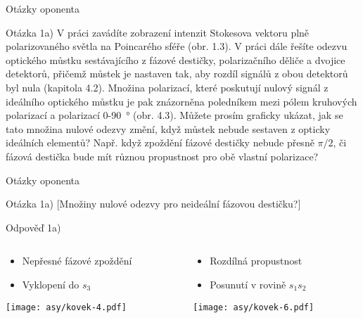 \begin{frame}{Otázky oponenta}
    \begin{block}{Otázka 1a)}
        V práci zavádíte zobrazení intenzit Stokesova vektoru plně polarizovaného světla na
        Poincarého sféře (obr. 1.3).
        V práci dále řešíte odezvu optického můstku sestávajícího z fázové destičky, polarizačního děliče a dvojice detektorů, přičemž můstek je nastaven tak, aby rozdíl signálů z obou detektorů byl nula (kapitola 4.2).
        Množina polarizací, které poskutují nulový signál z ideálního optického můstku je pak znázorněna poledníkem mezi pólem kruhových polarizací a polarizací 0-\SI{90}{\degree} (obr. 4.3).
        Můžete prosím graficky ukázat, jak se tato množina nulové odezvy změní, když můstek nebude sestaven z opticky ideálních elementů?
        Např. když zpoždění fázové destičky nebude přesně $\pi/2$, či fázová destička bude mít různou propustnost pro obě vlastní polarizace?
    \end{block}
\end{frame}

\begin{frame}{Otázky oponenta}
    \begin{block}{Otázka 1a)}
        [Množiny nulové odezvy pro neideální fázovou destičku?]
    \end{block}
    \begin{exampleblock}{Odpověď 1a)}
        \begin{columns}
            \begin{column}{0.5\textwidth}
                \begin{itemize}
                    \item Nepřesné fázové zpoždění
                    \item Vyklopení do $s_3$ 
                \end{itemize} 
                \texttt{[image: asy/kovek-4.pdf]}
            \end{column}
            \begin{column}{0.5\textwidth}
                \begin{itemize}
                    \item Rozdílná propustnost
                    \item Posunutí v rovině $s_1s_2$
                \end{itemize} 
                \texttt{[image: asy/kovek-6.pdf]}
            \end{column}
        \end{columns}
    \end{exampleblock}
\end{frame}

